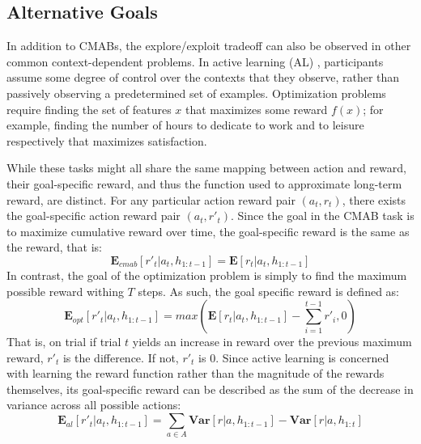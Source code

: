 \documentclass[10pt,letterpaper]{article}
\begin{document}
	\subsection{Alternative Goals}
	
	In addition to CMABs, the explore/exploit tradeoff can also be observed in other common context-dependent problems. In active learning (AL) \cite{BramleyGerstenbergTenenbaum2016a}, participants assume some degree of control over the contexts that they observe, rather than passively observing a predetermined set of examples. Optimization problems \cite{Rachlin1981a} require finding the set of features $x$ that maximizes some reward $f(x)$; for example, finding the number of hours to dedicate to work and to leisure respectively that maximizes satisfaction.
	
	While these tasks might all share the same mapping between action and reward, their goal-specific reward, and thus the function used to approximate long-term reward, are distinct. For any particular action reward pair $(a_{t}, r_{t})$, there exists the goal-specific action reward pair $(a_{t}, r'_{t})$. Since the goal in the CMAB task is to maximize cumulative reward over time, the goal-specific reward is the same as the reward, that is:
	$$\mathbf{E}_{cmab}[r'_{t}|a_{t}, h_{1:t-1}] = \mathbf{E}[r_{t}|a_{t}, h_{1:t-1}]$$
	In contrast, the goal of the optimization problem is simply to find the maximum possible reward withing $T$ steps. As such, the goal specific reward is defined as:
	$$\mathbf{E}_{opt}[r'_{t}|a_{t}, h_{1:t-1}] = max(\mathbf{E}[r_{t}|a_{t}, h_{1:t-1}] - \sum_{i=1}^{t-1}r'_{i}, 0)$$
	That is, on trial if trial $t$ yields an increase in reward over the previous maximum reward, $r'_{t}$ is the difference. If not, $r'_{t}$ is 0. Since active learning is concerned with learning the reward function rather than the magnitude of the rewards themselves, its goal-specific reward can be described as the sum of the decrease in variance across all possible actions:
	$$\mathbf{E}_{al}[r'_{t}|a_{t}, h_{1:t-1}] = \sum_{a \in A} \mathbf{Var}[r|a,h_{1:t-1}] - \mathbf{Var}[r|a,h_{1:t}]$$
	
	
	
	\setlength{\bibleftmargin}{.125in}
	\setlength{\bibindent}{-\bibleftmargin}
	
	
		
	
\end{document}
